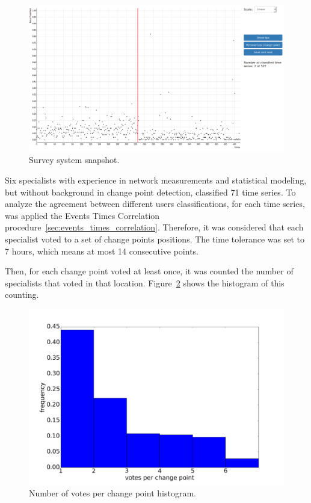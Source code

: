 \begin{figure}[H]
    \centering
    \includegraphics[width=0.9\linewidth]{./figures/methodology/supervised_learning_try/survey_system.png}
    \caption{Survey system snapshot.}
\label{fig:survey_system}
\end{figure}%

Six specialists with experience in network measurements and statistical
modeling, but without background in change point detection, classified 71 time
series.
To analyze the agreement between different users classifications,
for each time series, was applied the Events Times Correlation
procedure~\ref{sec:events_times_correlation}. Therefore, it was
considered that each specialist voted to a set of change points positions.
The time tolerance was set to 7 hours, which means at most 14 consecutive
points.

Then, for each change point voted at least once, it was counted the number of
specialists that voted in that location.
Figure~\ref{fig:classifications_per_vote} shows the histogram of this counting.

\begin{figure}[H]
    \centering
    \includegraphics[width=0.7\linewidth]{./figures/methodology/supervised_learning_try/cnt_classifications_per_vote.png}
    \caption{Number of votes per change point histogram.}
\label{fig:classifications_per_vote}
\end{figure}%


